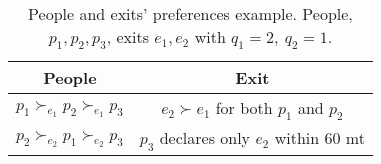 \begin{table}[!htb]
    \centering
    \begin{tabular}{c|c}
        \hline People & Exit \\
        \hline \(p_1 \succ_{e_1} p_2 \succ_{e_1} p_3\) & \(e_2 \succ e_1\) for both \(p_1\) and \(p_2\) \\
        \(p_2 \succ_{e_2} p_1 \succ_{e_2} p_3\) & \(p_3\) declares only \(e_2\) within 60 mt \\
        \hline
    \end{tabular}
    \caption{People and exits' preferences example. People, \(p_1, p_2, p_3\), exits \(e_1, e_2\) with \( q_1 = 2, \ q_2 = 1\).}
    \label{tab:people-exit}
\end{table}
